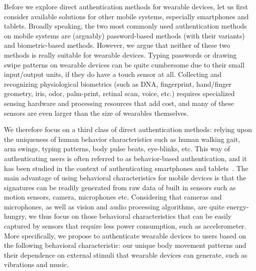Before we explore direct authentication methods for wearable devices, let us
first consider available solutions for other mobile systems, especially
smartphones and tablets. Broadly speaking, the two most commonly used
authentication methods on mobile systems are (arguably) password-based methods
(with their variants) and biometric-based methods. However, we argue that
neither of these two methods is really suitable for wearable devices. Typing
passwords or drawing swipe patterns on wearable devices can be quite
cumbersome due to their small input/output units, if they do have a touch
sensor at all. Collecting and recognizing physiological biometrics (such as
DNA, fingerprint, hand/finger geometry, iris, odor, palm-print, retinal scan,
voice, etc.) requires specialized sensing hardware and processing resources
that add cost, and many of these sensors are even larger than the size of wearables
themselves.

We therefore focus on a third class of direct authentication methods: relying upon the uniqueness of human behavior characteristics such as human walking gait, arm swings, typing patterns, body pulse beats, eye-blinks, etc. This way of authenticating users is often referred to as behavior-based authentication, and it has been studied in the context of authenticating smartphones and tablets~\cite{smartphoneauth,rahman2014bodybeat,cornelius2014wearable,stevenage1999visual,okumura2006study,monrose2000keystroke,jorgensen2011mouse,de2012touch}. The main advantage of using behavioral characteristics for mobile devices is that the signatures can be readily generated from raw data of built in sensors such as motion sensors, camera, microphones etc. Considering that cameras and microphones, as well as vision and audio processing algorithms, are quite energy-hungry, we thus focus on those behavioral characteristics that can be easily captured by sensors that require less power consumption, such as accelerometer. More specifically, we propose to authenticate wearable devices to users based on the following behavioral characteristic: our unique body movement patterns and their dependence on external stimuli that wearable devices can generate, such as vibrations and music.


